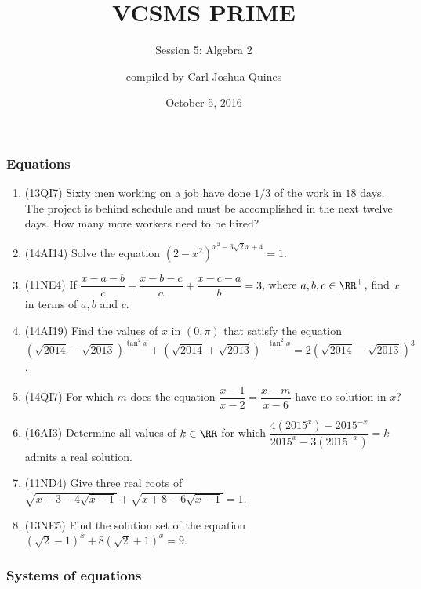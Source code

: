 \documentclass[10pt,paper=letter]{scrartcl}
\begin{document}
\title{VCSMS PRIME}
\subtitle{Session 5: Algebra 2}
\author{compiled by Carl Joshua Quines}
\date{October 5, 2016}

\maketitle

\subsubsection*{Equations}

\begin{enumerate}

\item (13QI7) Sixty men working on a job have done $1/3$ of the work in $18$ days. The project is behind schedule and must be accomplished in the next twelve days. How many more workers need to be hired?

\item (14AI14) Solve the equation $(2-x^2)^{x^2-3\sqrt{2}x+4} = 1$.

\item (11NE4) If $\dfrac{x-a-b}{c} + \dfrac{x-b-c}{a} + \dfrac{x-c-a}{b} = 3$, where $a, b, c \in \RR^+$, find $x$ in terms of $a, b$ and $c$.

\item (14AI19) Find the values of $x$ in $(0, \pi)$ that satisfy the equation $$(\sqrt{2014} - \sqrt{2013})^{\tan^2 x} + (\sqrt{2014} + \sqrt{2013})^{-\tan^2 x} = 2(\sqrt{2014} - \sqrt{2013})^3$$.

\item (14QI7) For which $m$ does the equation $\dfrac{x-1}{x-2} = \dfrac{x-m}{x-6}$ have no solution in $x$?

\item (16AI3) Determine all values of $k \in \RR$ for which $\dfrac{4(2015^x) - 2015^{-x}}{2015^x - 3(2015^{-x})} = k$ admits a real solution.

\item (11ND4) Give three real roots of $\sqrt{x+3-4\sqrt{x-1}} + \sqrt{x+8 - 6\sqrt{x-1}} = 1$.

\item (13NE5) Find the solution set of the equation $(\sqrt{2} - 1)^x + 8(\sqrt{2} + 1)^x = 9$.

\end{enumerate}

\subsubsection*{Systems of equations}
\end{document}
